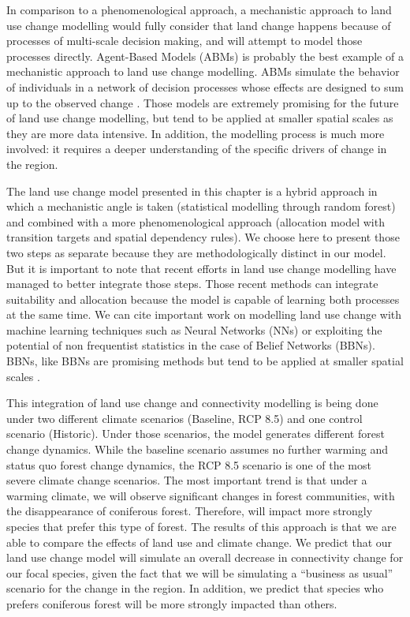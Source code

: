 In comparison to a phenomenological approach, a mechanistic approach to land use change modelling would fully consider that land change happens because of processes of multi-scale decision making, and will attempt to model those processes directly. Agent-Based Models (ABMs) is probably the best example of a mechanistic approach to land use change modelling. ABMs simulate the behavior of individuals in a network of decision processes whose effects are designed to sum up to the observed change \citep{parker_agent-based_2002, filatova_spatial_2013}. Those models are extremely promising for the future of land use change modelling, but tend to be applied at smaller spatial scales as they are more data intensive. In addition, the modelling process is much more involved: it requires a deeper understanding of the specific drivers of change in the region.

The land use change model presented in this chapter is a  hybrid approach in which a mechanistic angle is taken (statistical modelling through random forest) and combined with a more phenomenological approach (allocation model with transition targets and spatial dependency rules).  We choose here to present those two steps as separate because they are methodologically distinct in our model. But it is important to note that recent efforts in land use change modelling have managed to better integrate those steps. Those recent methods can integrate suitability and allocation because the model is capable of learning both processes at the same time. We can cite important work on modelling land use change with machine learning techniques such as Neural Networks (NNs) \citep{tayyebi_simulating_2013} or exploiting the potential of non frequentist statistics in the case of Belief Networks (BBNs). BBNs, like BBNs are promising methods but tend to be applied at smaller spatial scales \citep{celio_modeling_2014}.

This integration of land use change and connectivity modelling is being done under two different climate scenarios (Baseline, RCP 8.5) and one control scenario (Historic). Under those scenarios, the model generates different forest change dynamics. While the baseline scenario assumes no further warming and status quo forest change dynamics, the RCP 8.5 scenario is one of the most severe climate change scenarios. The most important trend is that under a warming climate, we will observe significant changes in forest communities, with the disappearance of coniferous forest. Therefore,  will impact more strongly species that prefer this type of forest. The results of this approach is that we are able to compare the effects of land use and climate change. 
We predict that our land use change model will simulate an overall decrease in connectivity change for our focal species, given the fact that we will be simulating a “business as usual” scenario for the change in the region. In addition, we predict that species who prefers coniferous forest will be more strongly impacted than others.\\

